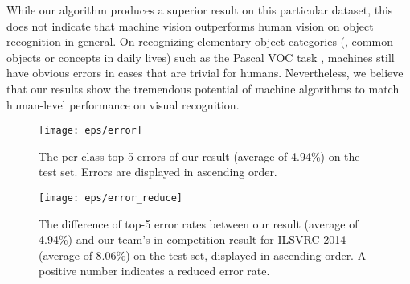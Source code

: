 \documentclass[10pt,twocolumn,letterpaper]{article}
\begin{document}
While our algorithm produces a superior result on this particular dataset, this does not indicate that machine vision outperforms human vision on object recognition in general.
On recognizing elementary object categories (\ie, common objects or concepts in daily lives) such as the Pascal VOC task \cite{Everingham2010}, machines still have obvious errors in cases that are trivial for humans.
Nevertheless, we believe that our results show the tremendous potential of machine algorithms to match human-level performance on visual recognition.

\begin{figure}[t]
\begin{center}
\texttt{[image: eps/error]}
\end{center}
\caption{The per-class top-5 errors of our result (average of 4.94\%) on the test set. Errors are displayed in ascending order.}
\label{fig:error}
\begin{center}
\texttt{[image: eps/error\_reduce]}
\end{center}
\caption{The difference of top-5 error rates between our result (average of 4.94\%) and our team's in-competition result for ILSVRC 2014 (average of 8.06\%) on the test set, displayed in ascending order. A positive number indicates a reduced error rate.}
\label{fig:error_reduce}
\end{figure}

{\small


}
\end{document}
